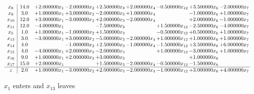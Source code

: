 \documentclass[10pt]{article}
\begin{document}
 \[\begin{array}{c| c c@{\hskip 2pt} c@{\hskip 2pt} c@{\hskip 2pt} c@{\hskip 2pt} c@{\hskip 2pt} c@{\hskip 2pt} c@{\hskip 2pt} }
 x_{8}   &  14.0 & + 2.000000 x_{1} & -2.000000 x_{2} & + 2.500000 x_{3} & + 2.000000 x_{4} & -0.500000 x_{12} & + 3.500000 x_{6} & -2.000000 x_{7}\\
 x_{9}   &  3.0 & + 1.000000 x_{1} & + 3.000000 x_{2} & -2.000000 x_{3} & + 1.000000 x_{4} &   & -1.000000 x_{6} & + 1.000000 x_{7}\\
 x_{10}   &  12.0 & + 3.000000 x_{1} & -3.000000 x_{2} & + 2.000000 x_{3} & -2.000000 x_{4} &   & + 2.000000 x_{6} & -1.000000 x_{7}\\
 x_{11}   &  12.0 & -4.000000 x_{1} &   & -7.500000 x_{3} &   & + 1.500000 x_{12} & -2.500000 x_{6} & -4.000000 x_{7}\\
 x_{5}   &  1.0 & + 1.000000 x_{1} & -1.000000 x_{2} & + 1.500000 x_{3} &   & -0.500000 x_{12} & + 0.500000 x_{6} & + 1.000000 x_{7}\\
 x_{13}   &  3.0 & -3.000000 x_{1} & + 3.000000 x_{2} & -5.000000 x_{3} & -2.000000 x_{4} & + 1.000000 x_{12} & + 1.000000 x_{6} & + 1.000000 x_{7}\\
 x_{14}   &  4.0  &   & -1.000000 x_{2} & + 2.500000 x_{3} & -1.000000 x_{4} & -1.500000 x_{12} & + 3.500000 x_{6} & + 6.000000 x_{7}\\
 x_{15}   &  4.0 & -4.000000 x_{1} & + 2.000000 x_{2} & -2.000000 x_{3} &   & + 1.000000 x_{12} & -3.000000 x_{6} & + 1.000000 x_{7}\\
 x_{16}   &  9.0 & + 1.000000 x_{1} & + 2.000000 x_{2} & + 3.000000 x_{3} &    &   & + 1.000000 x_{6} &   \\
 x_{17}   &  15.0 & + 2.000000 x_{1} &   & + 1.500000 x_{3} & -2.000000 x_{4} & -0.500000 x_{12} & -1.500000 x_{6} &   \\
\hline
z    &  2.0 & + 1.000000 x_{1} & -3.000000 x_{2} & + 2.000000 x_{3} & -2.000000 x_{4} & -1.000000 x_{12} & + 3.000000 x_{6} & + 4.000000 x_{7}\\
\end{array}\]


 $ x_{1} $ enters and $ x_{13} $ leaves 
\end{document}
